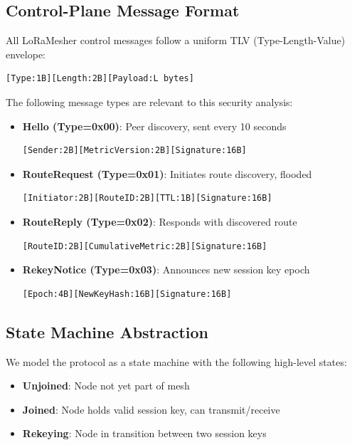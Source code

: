 \documentclass[10pt,journal]{IEEEtran}
\begin{document}
\subsection{Control-Plane Message Format}

All LoRaMesher control messages follow a uniform TLV (Type-Length-Value) envelope:
\begin{verbatim}
[Type:1B][Length:2B][Payload:L bytes]
\end{verbatim}

The following message types are relevant to this security analysis:
\begin{itemize}
	\item \textbf{Hello (Type=0x00)}: Peer discovery, sent every 10 seconds
	      \begin{verbatim}
[Sender:2B][MetricVersion:2B][Signature:16B]
		\end{verbatim}
	\item \textbf{RouteRequest (Type=0x01)}: Initiates route discovery, flooded
	      \begin{verbatim}
[Initiator:2B][RouteID:2B][TTL:1B][Signature:16B]
		\end{verbatim}
	\item \textbf{RouteReply (Type=0x02)}: Responds with discovered route
	      \begin{verbatim}
[RouteID:2B][CumulativeMetric:2B][Signature:16B]
		\end{verbatim}
	\item \textbf{RekeyNotice (Type=0x03)}: Announces new session key epoch
	      \begin{verbatim}
[Epoch:4B][NewKeyHash:16B][Signature:16B]
		\end{verbatim}
\end{itemize}

\subsection{State Machine Abstraction}

We model the protocol as a state machine with the following high-level states:
\begin{itemize}
	\item \textbf{Unjoined}: Node not yet part of mesh
	\item \textbf{Joined}: Node holds valid session key, can transmit/receive
	\item \textbf{Rekeying}: Node in transition between two session keys
\end{itemize}
\end{document}

